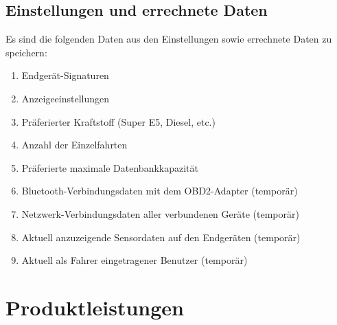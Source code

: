 \documentclass[pflichtenheft.tex]{subfiles}
\begin{document}
\section{Einstellungen und errechnete Daten}
Es sind die folgenden Daten aus den Einstellungen sowie errechnete Daten zu speichern:

\begin{enumerate}
\setcounter{enumi}{\value{enumTemp}}
\item Endgerät-Signaturen
\item Anzeigeeinstellungen
\item Präferierter Kraftstoff (Super E5, Diesel, etc.)
\item Anzahl der Einzelfahrten
\item Präferierte maximale Datenbankkapazität
\item Bluetooth-Verbindungsdaten mit dem OBD2-Adapter (temporär)
\item Netzwerk-Verbindungsdaten aller verbundenen Geräte (temporär) 
\item Aktuell anzuzeigende Sensordaten auf den Endgeräten (temporär)
\item Aktuell als Fahrer eingetragener Benutzer (temporär)
\setcounter{enumTemp}{\value{enumi}}
\end{enumerate}


\setcounter{enumTemp}{\value{enumi}}

\chapter{Produktleistungen}

\renewcommand{\theenumi}{/PL\ifnum \value{enumi}<10 0\fi\arabic{enumi}0/}
\renewcommand{\labelenumi}{\theenumi}
\renewcommand{\theenumii}{\arabic{enumii}}
\renewcommand{\labelenumii}{PL\ifnum \value{enumi}<10 0\fi\arabic{enumi}\arabic{enumii}/}
\end{document}
